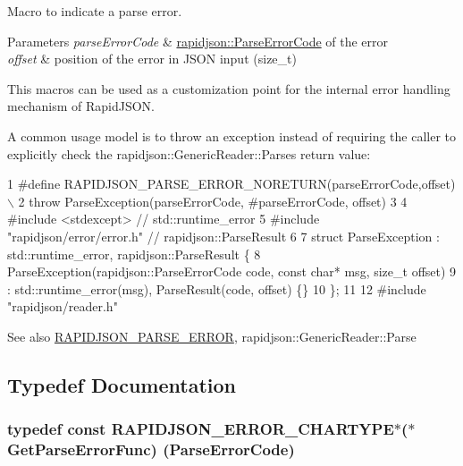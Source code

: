 Macro to indicate a parse error. 


\begin{DoxyParams}{Parameters}
{\em parse\+Error\+Code} & \hyperlink{group___r_a_p_i_d_j_s_o_n___e_r_r_o_r_s_ga8d4b32dfc45840bca189ade2bbcb6ba7}{rapidjson\+::\+Parse\+Error\+Code} of the error \\
\hline
{\em offset} & position of the error in J\+S\+ON input ({\ttfamily size\+\_\+t})\\
\hline
\end{DoxyParams}
This macros can be used as a customization point for the internal error handling mechanism of Rapid\+J\+S\+ON.

A common usage model is to throw an exception instead of requiring the caller to explicitly check the rapidjson\+::\+Generic\+Reader\+::\+Parse\textquotesingle{}s return value\+:


\begin{DoxyCode}
1 #define RAPIDJSON\_PARSE\_ERROR\_NORETURN(parseErrorCode,offset) \(\backslash\)
2    throw ParseException(parseErrorCode, #parseErrorCode, offset)
3 
4 #include <stdexcept>               // std::runtime\_error
5 #include "rapidjson/error/error.h" // rapidjson::ParseResult
6 
7 struct ParseException : std::runtime\_error, rapidjson::ParseResult \{
8   ParseException(rapidjson::ParseErrorCode code, const char* msg, size\_t offset)
9     : std::runtime\_error(msg), ParseResult(code, offset) \{\}
10 \};
11 
12 #include "rapidjson/reader.h"
\end{DoxyCode}


\begin{DoxySeeAlso}{See also}
\hyperlink{group___r_a_p_i_d_j_s_o_n___e_r_r_o_r_s_gae3689840fa6e89a241313f33b602f865}{R\+A\+P\+I\+D\+J\+S\+O\+N\+\_\+\+P\+A\+R\+S\+E\+\_\+\+E\+R\+R\+OR}, rapidjson\+::\+Generic\+Reader\+::\+Parse 
\end{DoxySeeAlso}


\subsection{Typedef Documentation}
\subsubsection[{\texorpdfstring{Get\+Parse\+Error\+Func}{GetParseErrorFunc}}]{\setlength{\rightskip}{0pt plus 5cm}typedef const {\bf R\+A\+P\+I\+D\+J\+S\+O\+N\+\_\+\+E\+R\+R\+O\+R\+\_\+\+C\+H\+A\+R\+T\+Y\+PE}$\ast$($\ast$ Get\+Parse\+Error\+Func) ({\bf Parse\+Error\+Code})}\hypertarget{group___r_a_p_i_d_j_s_o_n___e_r_r_o_r_s_ga586548166441ab3ce30219cb35be2e04}{}\label{group___r_a_p_i_d_j_s_o_n___e_r_r_o_r_s_ga586548166441ab3ce30219cb35be2e04}


